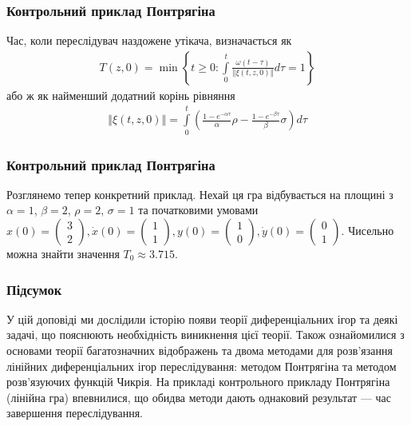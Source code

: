 \documentclass[10pt,pdf,aspectratio=169]{beamer}
\renewcommand{\d}[1]{\dot{#1}}
\renewcommand{\l}{\left}
\renewcommand{\r}{\right}
\newcommand{\norm}[1]{\left\Vert #1 \right\Vert}
\newcommand{\intl}{\int\limits}
\begin{document}
    \begin{frame}
        \frametitle{Контрольний приклад Понтрягіна}
    
        Час, коли переслідувач наздожене утікача, визначається як
        \begin{gather*}
            T(z, 0) = \min \l\{ t\geq 0 : \intl_0^t \frac{\omega(t-\tau)}{\norm{\xi(t, z, 0)}} d\tau = 1 \r\}
        \end{gather*}
        або ж як найменший додатний корінь рівняння
        \begin{gather*}
            \norm{\xi(t, z, 0)} = \intl_0^t \l(\frac{1 - e^{-\alpha \tau}}{\alpha} \rho - \frac{1 - e^{-\beta \tau}}{\beta} \sigma\r) d\tau
        \end{gather*}
    
    \end{frame}
    \begin{frame}
        \frametitle{Контрольний приклад Понтрягіна}
    
        Розглянемо тепер конкретний приклад. Нехай ця гра відбувається на площині з 
        $\alpha=1$, $\beta=2$, $\rho=2$, $\sigma=1$ та
        початковими умовами $x(0) = \begin{pmatrix}
            3 \\ 2
        \end{pmatrix}, \d{x}(0) = \begin{pmatrix}
            1 \\ 1
        \end{pmatrix}, y(0) = \begin{pmatrix}
            1 \\ 0
        \end{pmatrix}, \d{y}(0) = \begin{pmatrix}
            0 \\ 1
        \end{pmatrix}$.
        Чисельно можна знайти значення $T_0 \approx 3.715$.
        \begin{center}
            \resizebox{160pt}{!}{
                
            }
        \end{center}
    
    \end{frame}
    \begin{frame}
        \frametitle{Підсумок}
        У цій доповіді ми дослідили історію появи теорії диференціальних ігор та деякі
        задачі, що пояснюють необхідність виникнення цієї теорії. Також ознайомилися з основами теорії багатозначних відображень та
        двома методами для розв'язання лінійних диференціальних ігор переслідування: методом Понтрягіна та
        методом розв'язуючих функцій Чикрія. На прикладі контрольного прикладу Понтрягіна (лінійна гра)
        впевнилися, що обидва методи дають однаковий результат --- час завершення переслідування.
    \end{frame}
\end{document}

